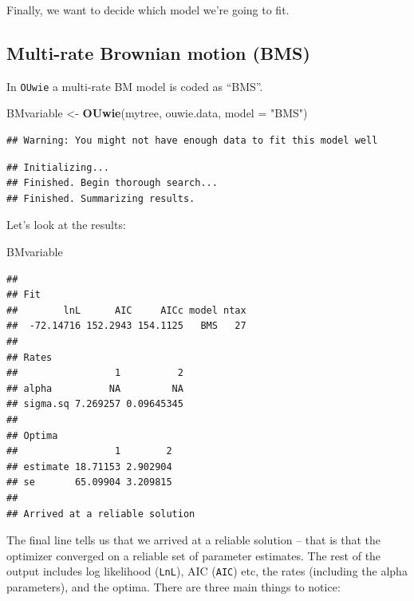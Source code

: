 \documentclass[]{book}
\newenvironment{Shaded}{\begin{snugshade}}{\end{snugshade}}
\newcommand{\KeywordTok}[1]{\textcolor[rgb]{0.13,0.29,0.53}{\textbf{{#1}}}}
\newcommand{\DataTypeTok}[1]{\textcolor[rgb]{0.13,0.29,0.53}{{#1}}}
\newcommand{\StringTok}[1]{\textcolor[rgb]{0.31,0.60,0.02}{{#1}}}
\newcommand{\NormalTok}[1]{{#1}}
\theoremstyle{definition}
\theoremstyle{definition}
\theoremstyle{definition}
\theoremstyle{remark}
\begin{document}
Finally, we want to decide which model we're going to fit.

\subsection{Multi-rate Brownian motion
(BMS)}\label{multi-rate-brownian-motion-bms}

In \texttt{OUwie} a multi-rate BM model is coded as ``BMS''.

\begin{Shaded}
\begin{Highlighting}[]
\NormalTok{BMvariable <-}\StringTok{ }\KeywordTok{OUwie}\NormalTok{(mytree, ouwie.data, }\DataTypeTok{model =} \StringTok{"BMS"}\NormalTok{)}
\end{Highlighting}
\end{Shaded}

\begin{verbatim}
## Warning: You might not have enough data to fit this model well
\end{verbatim}

\begin{verbatim}
## Initializing... 
## Finished. Begin thorough search... 
## Finished. Summarizing results.
\end{verbatim}

Let's look at the results:

\begin{Shaded}
\begin{Highlighting}[]
\NormalTok{BMvariable}
\end{Highlighting}
\end{Shaded}

\begin{verbatim}
## 
## Fit
##        lnL      AIC     AICc model ntax
##  -72.14716 152.2943 154.1125   BMS   27
## 
## Rates
##                 1          2
## alpha          NA         NA
## sigma.sq 7.269257 0.09645345
## 
## Optima
##                 1        2
## estimate 18.71153 2.902904
## se       65.09904 3.209815
## 
## Arrived at a reliable solution
\end{verbatim}

The final line tells us that we arrived at a reliable solution -- that
is that the optimizer converged on a reliable set of parameter
estimates. The rest of the output includes log likelihood
(\texttt{LnL}), AIC (\texttt{AIC}) etc, the rates (including the alpha
parameters), and the optima. There are three main things to notice:
\end{document}
